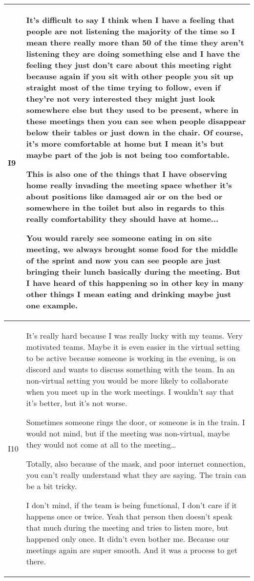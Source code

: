 \begin{longtable}{|  p{}  |  p{} |}
    \\
\hline
\vspace{-0.5cm} I9 &
  It's difficult to say I think when I have a feeling that people are not listening the majority of the time so I mean there really more than 50 of the time they aren't listening they are doing something else and I have the feeling they just don't care about this meeting right because again if you sit with other people you sit up straight most of the time trying to follow, even if they're not very interested they might just look somewhere else but they used to be present, where in these meetings then you can see when people disappear below their tables or just down in the chair. Of course, it's more comfortable at home but I mean it's but maybe part of the job is not being too comfortable.

This is also one of the things that I have observing home really invading the meeting space whether it’s about positions like damaged air or on the bed or somewhere in the toilet but also in regards to this really comfortability they should have at home...

You would rarely see someone eating in on site meeting, we always brought some food for the middle of the sprint and now you can see people are just bringing their lunch basically during the meeting. But I have heard of this happening so in other key in many other things I mean eating and drinking maybe just one example.
  \\
\hline
\vspace{-0.5cm} I10 & 
It’s really hard because I was really lucky with my teams. Very motivated teams. Maybe it is even easier in the virtual setting to be active because someone is working in the evening, is on discord and wants to discuss something with the team. In an non-virtual setting you would be more likely to collaborate when you meet up in the work meetings. I wouldn’t say that it’s better, but it’s not worse.

Sometimes someone rings the door, or someone is in the train. I would not mind, but if the meeting was non-virtual, maybe they would not come at all to the meeting…

Totally, also because of the mask, and poor internet connection, you can’t really understand what they are saying. The train can be a bit tricky.

I don’t mind, if the team is being functional, I don’t care if it happens once or twice. Yeah that person then doesn’t speak that much during the meeting and tries to listen more, but happened only once. It didn’t even bother me. Because our meetings again are super smooth. And it was a process to get there.
     \\
\hline
\end{longtable}

